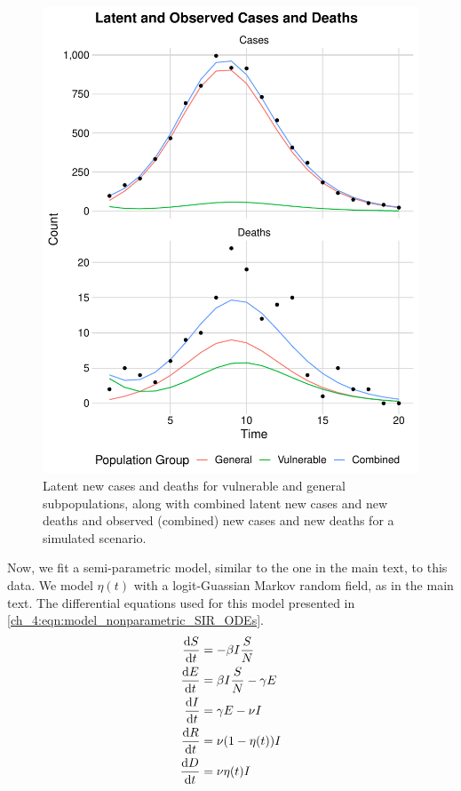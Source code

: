 \begin{figure}[htbp]
    \centering
    \includegraphics[width=0.75\columnwidth]{data_ifr_age_structure_plot}
    \caption{Latent new cases and deaths for vulnerable and general subpopulations, along with combined latent new cases and new deaths and observed (combined) new cases and new deaths for a simulated scenario.}
    \label{ch_4:fig:data_ifr_age_structure_plot}
\end{figure}

Now, we fit a semi-parametric model, similar to the one in the main text, to this data.
We model \( \eta(t) \) with a logit-Guassian Markov random field, as in the main text.
The differential equations used for this model presented in \eqref{ch_4:eqn:model_nonparametric_SIR_ODEs}.
\begin{equation}
\label{ch_4:eqn:model_nonparametric_SIR_ODEs}
\begin{aligned}
\frac{\mathrm{d} S}{\mathrm{d} t} &= - \beta I \frac{S}{N}\\
\frac{\mathrm{d} E}{\mathrm{d} t} &= \beta I \frac{S}{N} - \gamma E\\
\frac{\mathrm{d} I}{\mathrm{d} t} &= \gamma E - \nu I\\
\frac{\mathrm{d} R}{\mathrm{d} t} &= \nu (1 - \eta(t)) I\\
\frac{\mathrm{d} D}{\mathrm{d} t} &= \nu \eta(t) I\\
\end{aligned}
\end{equation}

